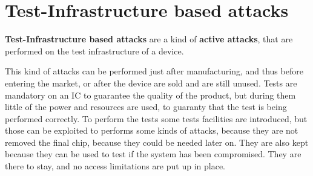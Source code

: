 \chapter{Test-Infrastructure based attacks}
\begin{boxH}
  \textbf{Test-Infrastructure based attacks} are a kind of \textbf{active attacks}, that are
  performed on the test infrastructure of a device.
\end{boxH}
This kind of attacks can be performed just after manufacturing, and thus before entering the market,
or after the device are sold and are still unused.
Tests are mandatory on an IC to guarantee the quality of the product, but during them little of the
power and resources are used, to guaranty that the test is being performed correctly. To perform the
tests some tests facilities are introduced, but those can be exploited to performs some kinds of
attacks, because they are not removed the final chip, because they could be needed later on.
They are also kept because they can be used to test if the system has been compromised. They are
there to stay, and no access limitations are put up in place.\\

